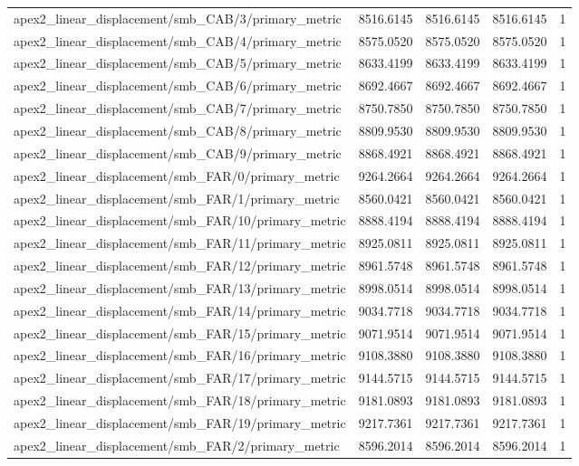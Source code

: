 \begin{table}[h]
\begin{tabular}{lrrrr}
apex2_linear_displacement/smb_CAB/3/primary_metric & 8516.6145 & 8516.6145 & 8516.6145 & 1 \\
apex2_linear_displacement/smb_CAB/4/primary_metric & 8575.0520 & 8575.0520 & 8575.0520 & 1 \\
apex2_linear_displacement/smb_CAB/5/primary_metric & 8633.4199 & 8633.4199 & 8633.4199 & 1 \\
apex2_linear_displacement/smb_CAB/6/primary_metric & 8692.4667 & 8692.4667 & 8692.4667 & 1 \\
apex2_linear_displacement/smb_CAB/7/primary_metric & 8750.7850 & 8750.7850 & 8750.7850 & 1 \\
apex2_linear_displacement/smb_CAB/8/primary_metric & 8809.9530 & 8809.9530 & 8809.9530 & 1 \\
apex2_linear_displacement/smb_CAB/9/primary_metric & 8868.4921 & 8868.4921 & 8868.4921 & 1 \\
apex2_linear_displacement/smb_FAR/0/primary_metric & 9264.2664 & 9264.2664 & 9264.2664 & 1 \\
apex2_linear_displacement/smb_FAR/1/primary_metric & 8560.0421 & 8560.0421 & 8560.0421 & 1 \\
apex2_linear_displacement/smb_FAR/10/primary_metric & 8888.4194 & 8888.4194 & 8888.4194 & 1 \\
apex2_linear_displacement/smb_FAR/11/primary_metric & 8925.0811 & 8925.0811 & 8925.0811 & 1 \\
apex2_linear_displacement/smb_FAR/12/primary_metric & 8961.5748 & 8961.5748 & 8961.5748 & 1 \\
apex2_linear_displacement/smb_FAR/13/primary_metric & 8998.0514 & 8998.0514 & 8998.0514 & 1 \\
apex2_linear_displacement/smb_FAR/14/primary_metric & 9034.7718 & 9034.7718 & 9034.7718 & 1 \\
apex2_linear_displacement/smb_FAR/15/primary_metric & 9071.9514 & 9071.9514 & 9071.9514 & 1 \\
apex2_linear_displacement/smb_FAR/16/primary_metric & 9108.3880 & 9108.3880 & 9108.3880 & 1 \\
apex2_linear_displacement/smb_FAR/17/primary_metric & 9144.5715 & 9144.5715 & 9144.5715 & 1 \\
apex2_linear_displacement/smb_FAR/18/primary_metric & 9181.0893 & 9181.0893 & 9181.0893 & 1 \\
apex2_linear_displacement/smb_FAR/19/primary_metric & 9217.7361 & 9217.7361 & 9217.7361 & 1 \\
apex2_linear_displacement/smb_FAR/2/primary_metric & 8596.2014 & 8596.2014 & 8596.2014 & 1 \\

\end{tabular}
\end{table}
